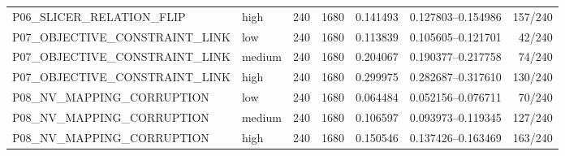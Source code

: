 \begin{table}[t]
\begin{tabular}{llllrrr}
P06\_SLICER\_RELATION\_FLIP & high & 240 & 1680 & 0.141493 & 0.127803--0.154986 & 157/240 \\
P07\_OBJECTIVE\_CONSTRAINT\_LINK & low & 240 & 1680 & 0.113839 & 0.105605--0.121701 & 42/240 \\
P07\_OBJECTIVE\_CONSTRAINT\_LINK & medium & 240 & 1680 & 0.204067 & 0.190377--0.217758 & 74/240 \\
P07\_OBJECTIVE\_CONSTRAINT\_LINK & high & 240 & 1680 & 0.299975 & 0.282687--0.317610 & 130/240 \\
P08\_NV\_MAPPING\_CORRUPTION & low & 240 & 1680 & 0.064484 & 0.052156--0.076711 & 70/240 \\
P08\_NV\_MAPPING\_CORRUPTION & medium & 240 & 1680 & 0.106597 & 0.093973--0.119345 & 127/240 \\
P08\_NV\_MAPPING\_CORRUPTION & high & 240 & 1680 & 0.150546 & 0.137426--0.163469 & 163/240 \\
\hline
\end{tabular}
\end{table}
